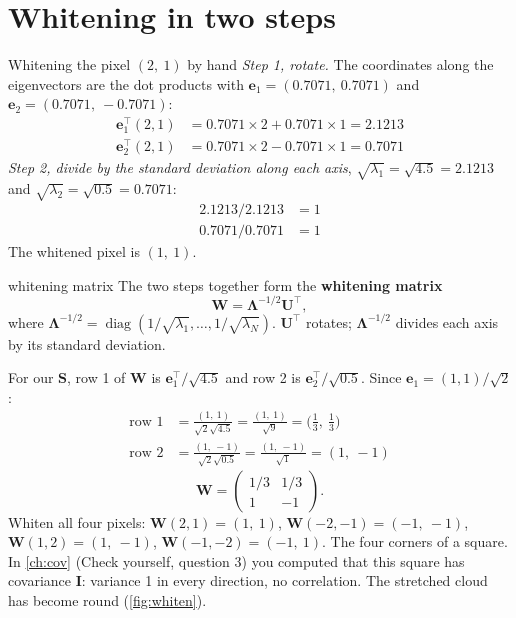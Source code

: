 \documentclass[11pt,a4paper,oneside,openany]{book}
\newcommand{\B}[1]{{\symbf{#1}}}
\newcommand{\B}[1]{{\bm{#1}}}
\newcommand{\T}{^{\top}}
\newcommand{\ve}{\B{e}}
\newcommand{\mS}{\B{S}}
\newcommand{\mW}{\B{W}}
\newcommand{\mU}{\B{U}}
\newcommand{\mI}{\B{I}}
\newcommand{\mLam}{\B{\Lambda}}
\begin{document}
\section{Whitening in two steps}

\begin{worked}[label=we:whiten]{Whitening the pixel $(2,\ 1)$ by hand}
\emph{Step 1, rotate.} The coordinates along the eigenvectors are the dot products with $\ve_1=(0.7071,\ 0.7071)$ and
$\ve_2=(0.7071,\ -0.7071)$:
\begin{align*}
\ve_1\T(2,1) &= 0.7071\times2+0.7071\times1=2.1213\\
\ve_2\T(2,1) &= 0.7071\times2-0.7071\times1=0.7071
\end{align*}
\emph{Step 2, divide by the standard deviation along each axis}, $\sqrt{\lambda_1}=\sqrt{4.5}=2.1213$ and
$\sqrt{\lambda_2}=\sqrt{0.5}=0.7071$:
\begin{align*}
2.1213/2.1213 &= 1\\
0.7071/0.7071 &= 1
\end{align*}
The whitened pixel is $(1,\ 1)$.
\end{worked}

\begin{defn}{whitening matrix}
The two steps together form the \textbf{whitening matrix}
\[
  \mW=\mLam^{-1/2}\mU\T ,
\]
where $\mLam^{-1/2}=\operatorname{diag}(1/\sqrt{\lambda_1},\dots,1/\sqrt{\lambda_N})$. $\mU\T$ rotates; $\mLam^{-1/2}$ divides each
axis by its standard deviation.
\end{defn}

For our $\mS$, row 1 of $\mW$ is $\ve_1\T/\sqrt{4.5}$ and row 2 is $\ve_2\T/\sqrt{0.5}$. Since $\ve_1=(1,1)/\sqrt2$:
\begin{align*}
\text{row 1} &= \frac{(1,\ 1)}{\sqrt2\sqrt{4.5}}=\frac{(1,\ 1)}{\sqrt9}=\Big(\tfrac13,\ \tfrac13\Big)\\
\text{row 2} &= \frac{(1,\ -1)}{\sqrt2\sqrt{0.5}}=\frac{(1,\ -1)}{\sqrt1}=(1,\ -1)
\end{align*}
\[
  \mW=\begin{pmatrix}1/3&1/3\\1&-1\end{pmatrix}.
\]
Whiten all four pixels: $\mW(2,1)=(1,\ 1)$, $\mW(-2,-1)=(-1,\ -1)$, $\mW(1,2)=(1,\ -1)$, $\mW(-1,-2)=(-1,\ 1)$. The four corners of
a square. In \cref{ch:cov} (Check yourself, question 3) you computed that this square has covariance $\mI$: variance 1 in every
direction, no correlation. The stretched cloud has become round (\cref{fig:whiten}).
\end{document}
